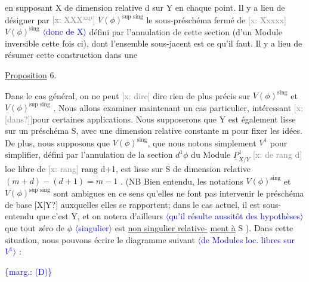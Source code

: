 \documentclass[11pt]{article}
\newcommand{\scanpage}[1]{\par\bigskip\noindent{\small\sffamily[scan #1]}\par}
\newcommand{\mspage}[1]{{\small\sffamily[p.\,#1]}}
\newcommand{\hand}[1]{\textcolor{blue}{#1}}
\newcommand{\inserted}[2][]{\textcolor{blue}{$\langle$#2$\rangle$}}
\newcommand{\margin}[1]{\textcolor{blue}{\{\textsf{marg.:} #1\}}}
\newcommand{\xout}[1]{\textcolor{gray}{[\textsf{x:} #1]}}
\newcommand{\uline}[1]{\underline{#1}}
\newcommand{\unsure}[1]{[#1?]}
\newenvironment{diagramblock}{\par\begin{center}}{\end{center}\par}
\begin{document}
\mspage{\hand{142}}

\clearpage
\scanpage{25/143}
\mspage{\hand{4}}

en supposant X de dimension relative d sur Y en chaque point.  Il y a
lieu de  désigner par \xout{XXX$^{\text{xxp}}$} $V(\phi)^{\text{sup sing}}$ le sous-préschéma fermé de
\xout{Xxxxx} $V(\phi)^{\text{sing}}$ \inserted[typed]{donc de X} défini par l'annulation de cette section (d'un Module
inversible cette fois ci),  dont l'ensemble  sous-jacent est ce qu'il
faut. Il y a lieu de résumer cette construction dans une

\uline{Proposition} 6.

Dans le cas général, on ne peut \xout{dire} dire rien de plus précis sur
$V(\phi)^{\text{sing}}$ et $V(\phi)^{\text{sup sing}}$ .  Nous allons  examiner maintenant un cas
particulier\hand{,} intéressant \xout{\unsure{dans}}pour certaines applications. Nous supposerons
que Y est également lisse sur un préschéma S, avec une dimension relative
constante m pour fixer les idées.  De plus, nous supposons que $V(\phi)^{\text{sing}}$,
que nous notons simplement $V^1$ pour simplifier, défini  par l'annulation
de la section $d^1\phi$  du Module $\underline{P}^1_{X/Y}$ \xout{de rang d} loc libre de \xout{rang} rang d+1,
est  lisse sur S de dimension relative  $(m+d) - (d+1) = m-1$ . (NB  Bien
entendu, les notations $V(\phi)^{\text{sing}}$ et $V(\phi)^{\text{sup sing}}$ sont ambigues en ce sens
qu'elles ne font pas intervenir le préschéma de base \unsure{X|Y} auxquelles elles
se rapportent; dans le cas actuel,  il est sous-entendu que c'est Y,
et on notera d'ailleurs \inserted[typed]{qu'il résulte aussitôt des hypothèses} que tout zéro de $\phi$ \inserted[typed]{singulier} est \uline{non singulier relative-}%
\uline{ment à} S ).  Dans cette situation, nous pouvons écrire  le diagramme
suivant \inserted{de Modules loc. libres sur $V^1$} :

\margin{(D)}
\begin{diagramblock}\end{diagramblock}
\end{document}
